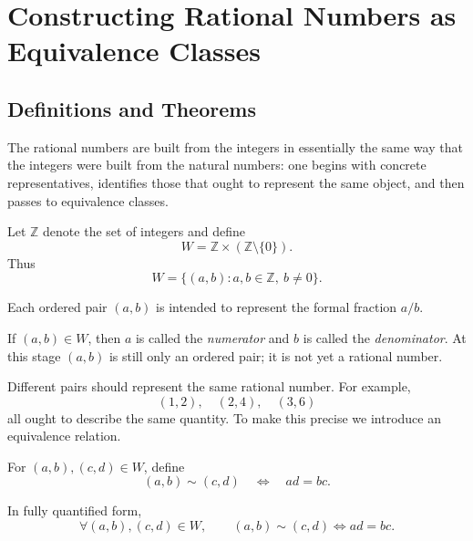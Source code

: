 
\section{Constructing Rational Numbers as Equivalence Classes}
\label{sec:constructing-rational-numbers-as-equivalence-classes}

\subsection{Definitions and Theorems}

The rational numbers are built from the integers in essentially the same way that the integers were
built from the natural numbers: one begins with concrete representatives, identifies those that ought
to represent the same object, and then passes to equivalence classes.

\begin{definition}
\label{def:fraction-pairs}

Let $\mathbb{Z}$ denote the set of integers and define
\[
W = \mathbb{Z} \times (\mathbb{Z}\setminus\{0\}).
\]
Thus
\[
W = \{(a,b) : a,b\in\mathbb{Z},\ b\neq 0\}.
\]

Each ordered pair $(a,b)$ is intended to represent the formal fraction $a/b$.

\end{definition}

\begin{remark}
\label{rem:numerator-denominator}

If $(a,b)\in W$, then $a$ is called the \emph{numerator} and $b$ is called the
\emph{denominator}.  At this stage $(a,b)$ is still only an ordered pair; it is not yet a rational
number.

\end{remark}

\begin{remark}
Different pairs should represent the same rational number.  For example,
\[
(1,2),\quad (2,4),\quad (3,6)
\]
all ought to describe the same quantity.  To make this precise we introduce an equivalence relation.
\end{remark}

\begin{definition}
\label{def:fraction-pair-equality}

For $(a,b),(c,d)\in W$, define
\[
(a,b) \sim (c,d)
\quad\Longleftrightarrow\quad
ad = bc.
\]

In fully quantified form,
\[
\forall (a,b),(c,d)\in W,
\qquad
(a,b)\sim(c,d)
\Longleftrightarrow
ad=bc.
\]

\end{definition}

